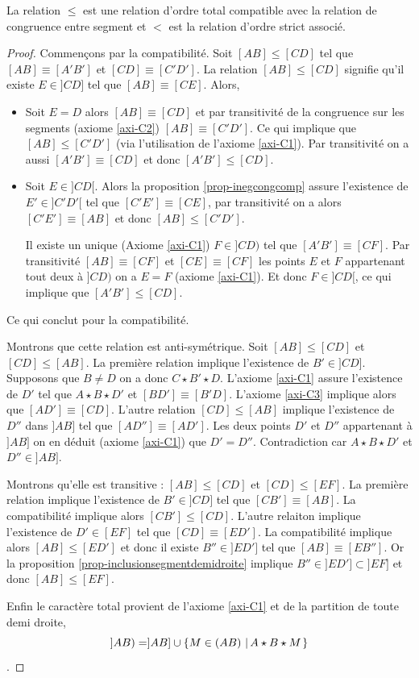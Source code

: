 \begin{thm}\label{thm-relationordretotal}
    La relation $\leq$ est une relation d'ordre total compatible avec la relation de congruence entre segment et $<$ est la relation d'ordre strict associé. 
\begin{proof}
    Commençons par la compatibilité. Soit $[AB]\leq [CD]$ tel que $[AB]\equiv [A'B']$ et $[CD]\equiv [C'D']$. La relation $[AB]\leq [CD]$ signifie qu'il existe $E\in ]CD]$ tel que $[AB]\equiv [CE]$. Alors, 
    \begin{itemize}[$\bullet$]
        \item Soit  $E = D$ alors $[AB]\equiv [CD]$ et par transitivité de la congruence sur les segments (axiome \ref{axi-C2}) $[AB]\equiv [C'D']$. Ce qui implique que $[AB] \leq [C'D']$ (via l'utilisation de l'axiome \ref{axi-C1}). Par transitivité on a aussi $[A'B']\equiv [CD]$ et donc $[A'B']\leq [CD]$. 
        \item Soit $E\in ]CD[$. Alors la proposition \ref{prop-inegcongcomp} assure l'existence de $E'\in ]C'D'[$ tel que $[C'E']\equiv [CE]$, par transitivité on a alors $[C'E']\equiv [AB]$ et donc $[AB]\leq [C'D']$. 

        Il existe un unique (Axiome \ref{axi-C1}) $F\in ]CD)$ tel que $[A'B']\equiv [CF]$. Par transitivité $[AB]\equiv [CF]$ et $[CE]\equiv [CF]$ les points $E$ et $F$ appartenant tout deux à $]CD)$ on a $E=F$ (axiome \ref{axi-C1}). Et donc $F\in ]CD[$, ce qui implique que $[A'B'] \leq [CD]$.  
    \end{itemize}
    Ce qui conclut pour la compatibilité.

    Montrons que cette relation est anti-symétrique. Soit $[AB]\leq [CD]$ et $[CD]\leq [AB]$. La première relation implique l'existence de $B'\in ]CD]$. Supposons que $B\neq D$ on a donc $C\star B' \star D$. L'axiome \ref{axi-C1} assure l'existence de $D'$ tel que $A\star B\star D'$ et $[BD']\equiv [B'D]$. L'axiome \ref{axi-C3} implique alors que $[AD']\equiv [CD]$. L'autre relation $[CD]\leq [AB]$ implique l'existence de $D''$ dans $]AB]$ tel que $[AD'']\equiv [AD']$. Les deux points $D'$ et $D''$ appartenant à $]AB]$ on en déduit (axiome \ref{axi-C1}) que $D'=D''$. Contradiction car $A\star B\star D'$ et $D''\in ]AB]$. 

    Montrons qu'elle est transitive : $[AB]\leq [CD] $ et $[CD] \leq [EF]$. La première relation implique l'existence de $B'\in ]CD]$ tel que $[CB']\equiv [AB]$. La compatibilité implique alors $[CB']\leq [CD]$. L'autre relaiton implique l'existence de $D'\in [EF]$ tel que $[CD]\equiv [ED']$. La compatibilité implique alors $[AB]\leq [ED']$ et donc il existe $B''\in ]ED']$ tel que $[AB]\equiv [EB'']$. Or la proposition \ref{prop-inclusionsegmentdemidroite} implique $B''\in ]ED']\subset ]EF]$ et donc $[AB]\leq [EF]$.

    Enfin le caractère total provient de l'axiome \ref{axi-C1} et de la partition de toute demi droite, $$]AB)=]AB]\cup\left\{M\in (AB)\,\left|\,A\star B\star M\right.\right\}$$.
\end{proof}
\end{thm}
    
